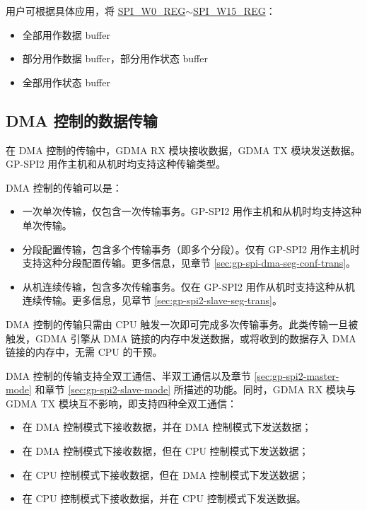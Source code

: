 \documentclass[main\_\_CN.tex]{subfiles}
\begin{document}
用户可根据具体应用，将 \hyperref[regdesc:SPIW0REG]{SPI\_W0\_REG}$\sim$\hyperref[regdesc:SPIW15REG]{SPI\_W15\_REG}：
\begin{itemize}
    \item 全部用作数据 buffer
    \item 部分用作数据 buffer，部分用作状态 buffer
    \item 全部用作状态 buffer
\end{itemize}


\subsection{DMA 控制的数据传输}\label{sec:usage-of-gp-spi2-dma-controlled-mode}
在 DMA 控制的传输中，GDMA RX 模块接收数据，GDMA TX 模块发送数据。GP-SPI2 用作主机和从机时均支持这种传输类型。

DMA 控制的传输可以是：

\begin{itemize}
    \item 一次单次传输，仅包含一次传输事务。GP-SPI2 用作主机和从机时均支持这种单次传输。
    \item 分段配置传输，包含多个传输事务（即多个分段）。仅有 GP-SPI2 用作主机时支持这种分段配置传输。更多信息，见章节  \ref{sec:gp-spi-dma-seg-conf-trans}。
    \item 从机连续传输，包含多次传输事务。仅在 GP-SPI2 用作从机时支持这种从机连续传输。更多信息，见章节  \ref{sec:gp-spi2-slave-seg-trans}。
\end{itemize}

DMA 控制的传输只需由 CPU 触发一次即可完成多次传输事务。此类传输一旦被触发，GDMA 引擎从 DMA 链接的内存中发送数据，或将收到的数据存入 DMA 链接的内存中，无需 CPU 的干预。

DMA 控制的传输支持全双工通信、半双工通信以及章节 \ref{sec:gp-spi2-master-mode} 和章节 \ref{sec:gp-spi2-slave-mode} 所描述的功能。同时，GDMA RX 模块与 GDMA TX 模块互不影响，即支持四种全双工通信：

\begin{itemize}
    \item 在 DMA 控制模式下接收数据，并在 DMA 控制模式下发送数据；
    
    \item 在 DMA 控制模式下接收数据，但在 CPU 控制模式下发送数据； 
    
    \item 在 CPU 控制模式下接收数据，但在 DMA 控制模式下发送数据；
    
    \item 在 CPU 控制模式下接收数据，并在 CPU 控制模式下发送数据。
    
\end{itemize}
\end{document}
